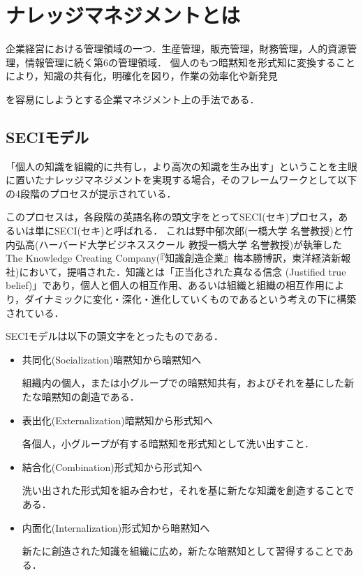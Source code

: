 \chapter{ナレッジマネジメントとは}
企業経営における管理領域の一つ．生産管理，販売管理，財務管理，人的資源管理，情報管理に続く第6の管理領域．
個人のもつ暗黙知を形式知に変換することにより，知識の共有化，明確化を図り，作業の効率化や新発見



を容易にしようとする企業マネジメント上の手法である\cite{management}．

\section{SECIモデル}
「個人の知識を組織的に共有し，より高次の知識を生み出す」ということを主眼に置いたナレッジマネジメントを実現する場合，そのフレームワークとして以下の4段階のプロセスが提示されている．

このプロセスは，各段階の英語名称の頭文字をとってSECI(セキ)プロセス，あるいは単にSECI(セキ)と呼ばれる．
これは野中郁次郎(一橋大学 名誉教授)と竹内弘高(ハーバード大学ビジネススクール 教授一橋大学 名誉教授)が執筆したThe Knowledge Creating Company(『知識創造企業』梅本勝博訳，東洋経済新報社)において，提唱された．知識とは「正当化された真なる信念 (Justified true belief)」であり，個人と個人の相互作用、あるいは組織と組織の相互作用により，ダイナミックに変化・深化・進化していくものであるという考えの下に構築されている．

SECIモデルは以下の頭文字をとったものである．
\begin{itemize}
  \item 共同化(Socialization)暗黙知から暗黙知へ

組織内の個人，または小グループでの暗黙知共有，およびそれを基にした新たな暗黙知の創造である．

  \item 表出化(Externalization)暗黙知から形式知へ

各個人，小グループが有する暗黙知を形式知として洗い出すこと．
  \item 結合化(Combination)形式知から形式知へ

洗い出された形式知を組み合わせ，それを基に新たな知識を創造することである．
  \item 内面化(Internalization)形式知から暗黙知へ

新たに創造された知識を組織に広め，新たな暗黙知として習得することである\cite{management}．

\end{itemize}

